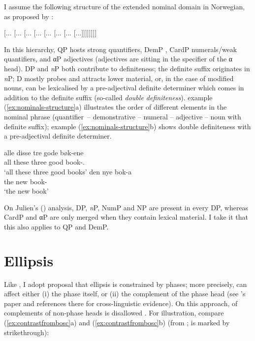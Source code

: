 \documentclass[output=paper]{langsci/langscibook}
\begin{document}
I assume the following  structure of the extended nominal domain in
Norwegian, as proposed by \citet{julien2005nominal}:

\ea\label{ex:julien-structure}
    {}[... [... [... [... [...
    [... [... [...]]]]]]]]
\z

\noindent In this hierarchy, QP hosts strong quantifiers, DemP
,
CardP numerals/weak quantifiers, and αP adjectives (adjectives are sitting in
the specifier of the α head).  DP and \emph{n}P both contribute to
definiteness; the definite suffix originates in \emph{n}P; D mostly probes
and attracts lower material, or, in the case of modified nouns, can be
lexicalised by a pre-adjectival definite determiner which comes in addition to
the definite suffix (so-called \emph{double definiteness}).  example
(\ref{ex:nominals-structure}a) illustrates the order of different elements in
the nominal phrase (quantifier~-- demonstrative -- numeral -- adjective -- noun
with definite suffix); example (\ref{ex:nominals-structure}b) shows double
definiteness with a pre-adjectival definite determiner.

\ea\label{ex:nominals-structure} 
    \ea
    \gll alle disse tre gode bøk-ene\\
    	all these three good book-\Pl.\Def{}\\
    	\glt `all these three good books'
    \ex	\gll den nye bok-a \\
    	the new book-\Def{} \\
    	\glt `the new book'
	\z
\z

\noindent  On Julien's (\citeyear[12]{julien2005nominal}) analysis, DP,
\emph{n}P, NumP and NP are present in every DP, whereas CardP and αP are only
merged when they contain lexical material. I take it that this also applies to
QP and DemP.

\section{Ellipsis}

Like \citet{simpson2017parallels}, I adopt  proposal that
ellipsis is constrained by phases; more precisely,  can affect either
(i) the phase itself, or (ii) the complement of the phase head (see
\citeauthor{Boskovic2014}'s paper and references there for cross-linguistic
evidence). On this approach,  of complements of non-phase heads is
disallowed \citep[42]{Boskovic2014}. For illustration, compare
(\ref{ex:contrastfrombosc}a) and  (\ref{ex:contrastfrombosc}b) (from
\citealt[56]{Boskovic2014};  is marked by strikethrough):
\end{document}
